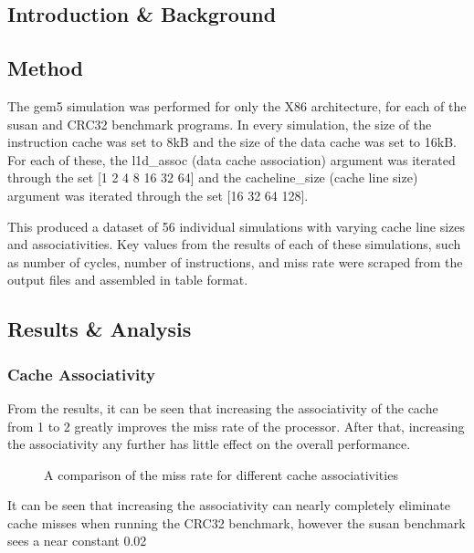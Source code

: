 
\subsection{Introduction \& Background}



\subsection{Method}

The gem5 simulation was performed for only the X86 architecture, for each of the 
susan and CRC32 benchmark programs. 
In every simulation, the size of the instruction cache was set to 8kB and the size 
of the data cache was set to 16kB.
For each of these, the l1d\_assoc (data cache association) argument was iterated 
through the set [1 2 4 8 16 32 64] and the cacheline\_size (cache line size) argument 
was iterated through the set [16 32 64 128].

This produced a dataset of 56 individual simulations with varying cache line sizes and 
associativities.
Key values from the results of each of these simulations, such as number of cycles, 
number of instructions, and miss rate were scraped from the output files and assembled 
in table format.

\subsection{Results \& Analysis}

\subsubsection{Cache Associativity}

From the results, it can be seen that increasing the associativity of the cache from 
1 to 2 greatly improves the miss rate of the processor. After that, increasing the 
associativity any further has little effect on the overall performance.

\begin{figure}[H]
    \centering
    
    \caption{A comparison of the miss rate for different cache associativities}
    \label{fig:partb-assoc}
\end{figure}

It can be seen that increasing the associativity can nearly completely eliminate 
cache misses when running the CRC32 benchmark, however the susan benchmark sees a near 
constant 0.02%

